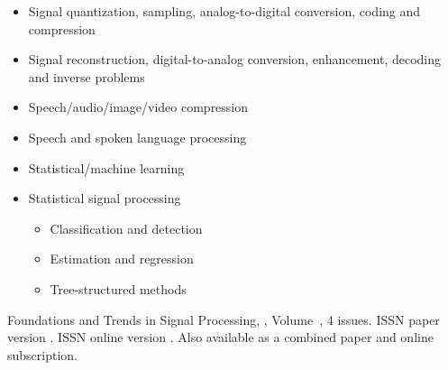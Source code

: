 {\begin{multicols}{2}
\begin{itemize}
\item{Signal quantization, sampling, analog-to-digital conversion, coding and compression}
\item{Signal reconstruction, digital-to-analog conversion, enhancement, decoding and inverse problems}
\item{Speech/audio/image/video compression}
\item{Speech and spoken language processing}
\item{Statistical/machine learning}
\item{Statistical signal processing}
	\begin{itemize}
	\item{Classification and detection}
	\item{Estimation and regression}
	\item{Tree-structured methods}
	\end{itemize}
\end{itemize}
\normalsize
 \end{multicols}
 }


\journallibraryinfo
 {%
  Foundations and Trends\textsuperscript{\textregistered} in
  Signal Processing, ,
  Volume~, 4 issues.
  ISSN paper version .
  ISSN online version .
  Also available as a combined paper and online
  subscription.
 } 